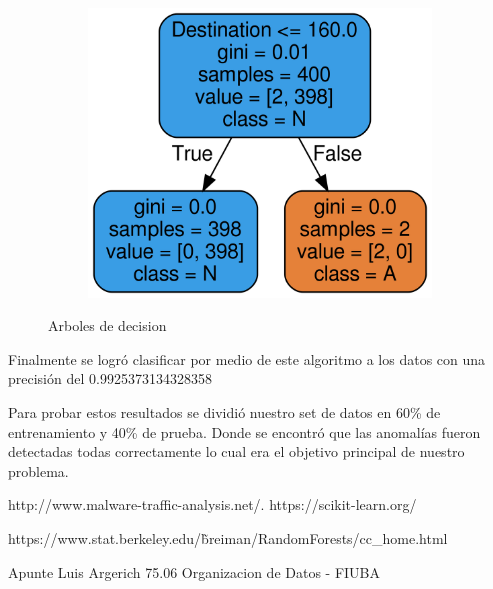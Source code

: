 \documentclass[a4paper,10pt]{article}
\begin{document}
\begin{figure}[!hbp]
\begin{subfigure}{.5\textwidth}
\end{subfigure}
\begin{subfigure}{.5\textwidth}
  \centering
  \includegraphics[width=.8\linewidth]{Wireshark/Tres/6.png}
  \caption{}
  \label{fig:sfig2}
\end{subfigure}

\caption{Arboles de decision}
\label{fig:fig}
\end{figure}

Finalmente se logró clasificar por medio de este algoritmo a los datos con una precisión del \Large{0.9925373134328358}

\medskip

\normalsize Para probar estos resultados se dividió nuestro set de datos en 60\% de entrenamiento y 40\% de prueba. Donde se encontró que las anomalías fueron detectadas todas correctamente lo cual era el objetivo principal de nuestro problema.

\newpage



\begin{thebibliography}{9}
  http://www.malware-traffic-analysis.net/.
 https://scikit-learn.org/

 https://www.stat.berkeley.edu/\~breiman/RandomForests/cc\_home.html

 Apunte Luis Argerich 75.06 Organizacion de Datos - FIUBA
\end{thebibliography}
\end{document}

